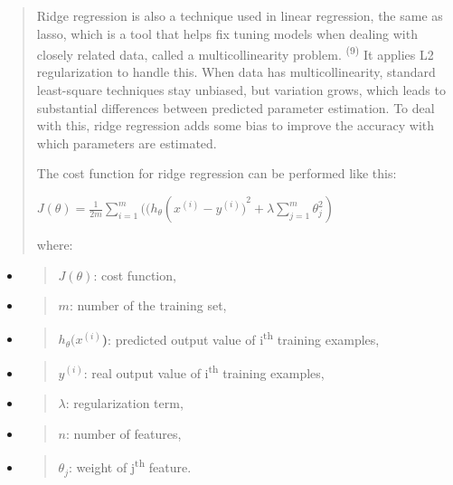 \documentclass[
]{article}
\begin{document}
\begin{quote}
Ridge regression is also a technique used in linear regression, the same
as lasso, which is a tool that helps fix tuning models when dealing with
closely related data, called a multicollinearity problem.
\textsuperscript{(9)} It applies L2 regularization to handle this. When
data has multicollinearity, standard least-square techniques stay
unbiased, but variation grows, which leads to substantial differences
between predicted parameter estimation. To deal with this, ridge
regression adds some bias to improve the accuracy with which parameters
are estimated.

The cost function for ridge regression can be performed like this:

\(J(\theta) = \frac{1}{2m}\sum_{i=1}^{m}((h_{\theta}(x^{(i)} - {y^{(i)})}^{2} + \lambda\sum_{j=1}^{m}\theta_{j}^{2})\)

where:
\end{quote}

\begin{itemize}
\item
  \begin{quote}
  \(J(\theta)\): cost function,
  \end{quote}
\item
  \begin{quote}
  \(m\): number of the training set,
  \end{quote}
\item
  \begin{quote}
  \(h_{\theta}(x^{(i)}\)\textbf{)}: predicted output value of
  i\textsuperscript{th} training examples,
  \end{quote}
\item
  \begin{quote}
  \(y^{(i)}\): real output value of i\textsuperscript{th} training
  examples,
  \end{quote}
\item
  \begin{quote}
  \(\lambda\): regularization term,
  \end{quote}
\item
  \begin{quote}
  \(n\): number of features,
  \end{quote}
\item
  \begin{quote}
  \(\theta_{j}\): weight of j\textsuperscript{th} feature.
  \end{quote}
\end{itemize}
\end{document}
